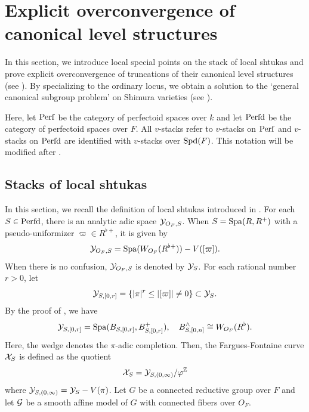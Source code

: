 \documentclass[12pt,reqno]{amsart}
\begin{document}

\section{Explicit overconvergence of canonical level structures} \label{sec:canonical_level_structures}

In this section, we introduce local special points on the stack of local shtukas and prove explicit overconvergence of truncations of their canonical level structures (see ). By specializing to the ordinary locus, we obtain a solution to the `general canonical subgroup problem' on Shimura varieties (see ). 

Here, let ${\operatorname{Perf}}$ be the category of perfectoid spaces over $k$ and let ${\operatorname{Perfd}}$ be the category of perfectoid spaces over $F$. All $v$-stacks refer to $v$-stacks on ${\operatorname{Perf}}$ and $v$-stacks on ${\operatorname{Perfd}}$ are identified with $v$-stacks over ${\operatorname{Spd}}(F)$. This notation will be modified after . 

\subsection{Stacks of local shtukas} \label{ssec:local_shtuka}

In this section, we recall the definition of local shtukas introduced in \cite{SW20}. For each $S \in {\operatorname{Perfd}}$, there is an analytic adic space ${\mathcal{Y}}_{O_F, S}$. When $S = {\operatorname{Spa}}(R,R^+)$ with a pseudo-uniformizer $\varpi \in R^{\flat+}$, it is given by
\[
    {\mathcal{Y}}_{O_F, S} = {\operatorname{Spa}}(W_{O_F}(R^{\flat+})) - V([\varpi]). 
\]
When there is no confusion, ${\mathcal{Y}}_{O_F, S}$ is denoted by ${\mathcal{Y}}_S$. For each rational number $r>0$, let 
\[
    {\mathcal{Y}}_{S,[0, r]} = \{ \lvert \pi \rvert^r \leq \lvert [\varpi] \rvert \neq 0 \} \subset {\mathcal{Y}}_S. 
\]
By the proof of \cite[Proposition II.1.1]{SW20}, we have
\begin{equation}
    {\mathcal{Y}}_{S, [0, r]} = {\operatorname{Spa}}(B_{S,[0, r]},B^+_{S,[0, r]}), \quad B_{S, [0, n]}^\wedge \cong W_{O_F}(R^\flat). \label{eq:YSn}
\end{equation}
Here, the wedge denotes the $\pi$-adic completion. Then, the Fargues-Fontaine curve ${\mathcal{X}}_S$ is defined as the quotient 
\[
    {\mathcal{X}}_S = {\mathcal{Y}}_{S, (0, \infty)} / \varphi^{\mathbb{Z}}
\]
where ${\mathcal{Y}}_{S, (0, \infty)} = {\mathcal{Y}}_{S} - V(\pi)$. Let $G$ be a connected reductive group over $F$ and let ${\mathcal{G}}$ be a smooth affine model of $G$ with connected fibers over $O_F$. 
\end{document}
